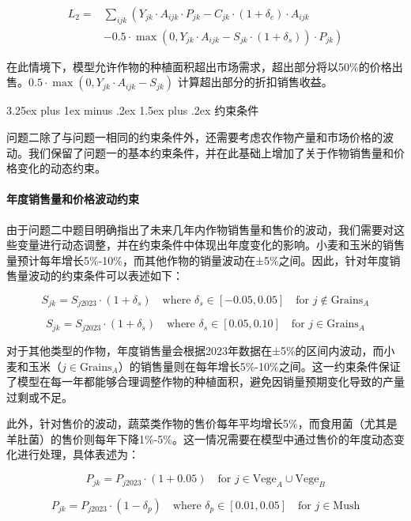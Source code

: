 \documentclass[12pt,a4paper]{nmmcm}
\makeatletter
\renewcommand\subsection{\@startsection{subsection}{2}{0pt}%
    {3.25ex plus 1ex minus .2ex}%
    {1.5ex plus .2ex}%
    {\normalfont\Large\bfseries}}
\makeatother
\begin{document}
\begin{align*}
  L_2 = & \sum_{ijk} \left( Y_{jk} \cdot A_{ijk} \cdot P_{jk}
  - C_{jk} \cdot (1 + \delta_c) \cdot A_{ijk} \right.           \\
        & \left. - 0.5 \cdot \max\left( 0, Y_{jk} \cdot A_{ijk}
  - S_{jk} \cdot (1 + \delta_s) \right) \cdot P_{jk} \right)
\end{align*}


在此情境下，模型允许作物的种植面积超出市场需求，超出部分将以50\%的价格出售。$0.5 \cdot \max(0, Y_{jk} \cdot A_{ijk} - S_{jk})$ 计算超出部分的折扣销售收益。

\subsection{约束条件}

问题二除了与问题一相同的约束条件外，还需要考虑农作物产量和市场价格的波动。我们保留了问题一的基本约束条件，并在此基础上增加了关于作物销售量和价格变化的动态约束。

\paragraph{年度销售量和价格波动约束}

由于问题二中题目明确指出了未来几年内作物销售量和售价的波动，我们需要对这些变量进行动态调整，并在约束条件中体现出年度变化的影响。小麦和玉米的销售量预计每年增长5\%-10\%，而其他作物的销量波动在±5\%之间。因此，针对年度销售量波动的约束条件可以表述如下：

\[
  S_{jk} = S_{j2023} \cdot (1 + \delta_s) \quad \text{where } \delta_s \in [-0.05, 0.05] \quad \text{for } j \notin \text{Grains}_A
\]

\[
  S_{jk} = S_{j2023} \cdot (1 + \delta_s) \quad \text{where } \delta_s \in [0.05, 0.10] \quad \text{for } j \in \text{Grains}_A
\]

对于其他类型的作物，年度销售量会根据2023年数据在±5\%的区间内波动，而小麦和玉米（$j \in \text{Grains}_A$）的销售量则在每年增长5\%-10\%之间。这一约束条件保证了模型在每一年都能够合理调整作物的种植面积，避免因销量预期变化导致的产量过剩或不足。

此外，针对售价的波动，蔬菜类作物的售价每年平均增长5\%，而食用菌（尤其是羊肚菌）的售价则每年下降1\%-5\%。这一情况需要在模型中通过售价的年度动态变化进行处理，具体表述为：

\[
  P_{jk} = P_{j2023} \cdot (1 + 0.05) \quad \text{for } j \in \text{Vege}_A \cup \text{Vege}_B
\]

\[
  P_{jk} = P_{j2023} \cdot (1 - \delta_p) \quad \text{where } \delta_p \in [0.01, 0.05] \quad \text{for } j \in \text{Mush}
\]
\end{document}
